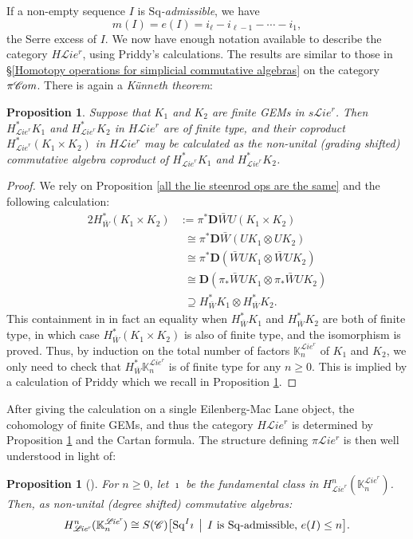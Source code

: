 \documentclass[11pt]{amsart} \renewcommand{\baselinestretch}{1.2}
\theoremstyle{plain}
\newtheorem{prop}[thm]{Proposition}
\numberwithin{equation}{section} %
\theoremstyle{plain}
\newtheorem{prop}[thm]{Proposition}
\numberwithin{equation}{chapter} %
\newcommand{\scrL}{\mathscr{L}}
\newcommand{\scrC}{\mathscr{C}}
\newcommand{\citeBOX}[2][]{\cite[\mbox{#1}]{#2}}
\newcommand{\CommOperad}{{\scrC}}
\newcommand{\PA}[1]{\pi#1}
\newcommand{\HA}[1]{H#1}
\newcommand{\minDimDelta}{m}
\newcommand{\Sq}{\mathrm{Sq}}
\newcommand{\algs}{{\scrC\!\textit{\normalfont\textit{om}}}}
\newcommand{\restliealgs}{{\scrL\!\textit{ie}^\textit{r}}}
\newcommand{\dual}{\mathbf{D}}
\begin{document}
\begin{Constructing cohomology operations}
If a non-empty sequence $I$  is \emph{$\Sq$-admissible}, we have 
\[\minDimDelta(I)=e(I)=i_\ell-i_{\ell-1}-\cdots -i_1,\]
the Serre excess of $I$. We now have enough notation available to describe the category $\HA{\restliealgs}$, using Priddy's calculations. The results are similar to those in \S\ref{Homotopy operations for simplicial commutative algebras} on the category $\PA{\algs}$.
There is again  a \emph{K\"unneth theorem}:
\begin{prop}
\label{Prop on cohomology of product of finite lie gems}
Suppose that $K_1$ and $K_2$ are finite GEMs in $s\restliealgs$. Then $H^*_\restliealgs K_1$ and $H^*_\restliealgs K_2$ in $\HA{\restliealgs}$ are of finite type, and their coproduct
$H^*_\restliealgs(K_1\times K_2)$ in $\HA{\restliealgs}$ may be calculated as the non-unital (grading shifted) commutative algebra coproduct of $H^*_\restliealgs K_1$ and $H^*_\restliealgs K_2$.
\end{prop}
\begin{proof}
We rely on Proposition \ref{all the lie steenrod ops are the same} and the following calculation:
\begin{alignat*}{2}
H^*_{\bar{W}}(K_1\times K_2)
&:=
\pi^*\dual \bar{W}U(K_1\times K_2)%
\\
&\phantom{:}\cong
\pi^*\dual \bar{W}(UK_1\otimes UK_2)%
\\
&\phantom{:}\cong
\pi^*\dual (\bar{W}UK_1\otimes \bar{W}UK_2)%
\\
&\phantom{:}\cong
\dual (\pi_*\bar{W}UK_1\otimes \pi_*\bar{W}UK_2)%
\\
&\phantom{:}\supseteq
H^*_{\bar{W}}K_1\otimes H^*_{\bar{W}}K_2.
\end{alignat*}
This containment in in fact an equality when $H^*_{\bar{W}}K_1 $ and $H^*_{\bar{W}}K_2$ are both of finite type, in which case $H^*_{\bar{W}}(K_1\times K_2)$ is also of finite type, and the isomorphism is proved. Thus, by induction on the total number of factors $\mathbb{K}_n^{\restliealgs}$ of $K_1$ and $K_2$, we only need to check that $H^*_{\bar{W}}\mathbb{K}_n^{\restliealgs}$ is of finite type for any $n\geq0$. This is implied by a calculation of Priddy \citeBOX[6.1]{PriddySimplicialLie.pdf} which we recall in Proposition \ref{calc of restliecoh on single EMobject}.
\end{proof}
\noindent After giving the calculation on a single Eilenberg-Mac Lane object, the cohomology of finite GEMs, and thus the category $\HA{\restliealgs}$ is determined by Proposition \ref{Prop on cohomology of product of finite lie gems} and the Cartan formula. The structure defining $\PA{\restliealgs}$ is then well understood in light of:
\begin{prop}[{\citeBOX[6.1]{PriddySimplicialLie.pdf}}]
\label{calc of restliecoh on single EMobject}
For $n\geq0$, let $\imath$ be the fundamental class in $H^n_{\restliealgs}(\mathbb{K}_n^{\restliealgs})$. Then, as non-unital (degree shifted) commutative algebras:
\[H^n_{\restliealgs}(\mathbb{K}_n^{\restliealgs})\cong S(\CommOperad)\bigl[\Sq^I\imath\,\bigm|\,\textup{$I$ is $\Sq$-admissible, $e(I)\leq n$}\bigr].\]
\end{prop}


\end{Constructing cohomology operations}
\end{document}
